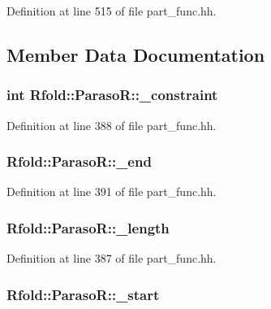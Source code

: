 Definition at line 515 of file part\+\_\+func.\+hh.



\subsection{Member Data Documentation}
\hypertarget{class_rfold_1_1_paraso_r_a869ef980793c7a669a5b89efdc107db5}{
\subsubsection[{\+\_\+constraint}]{\setlength{\rightskip}{0pt plus 5cm}int Rfold\+::\+Paraso\+R\+::\+\_\+constraint}}\label{class_rfold_1_1_paraso_r_a869ef980793c7a669a5b89efdc107db5}


Definition at line 388 of file part\+\_\+func.\+hh.

\hypertarget{class_rfold_1_1_paraso_r_aa0a39f36fc4917382d6e95174150791f}{
\subsubsection[{\+\_\+end}]{ Rfold\+::\+Paraso\+R\+::\+\_\+end}}\label{class_rfold_1_1_paraso_r_aa0a39f36fc4917382d6e95174150791f}


Definition at line 391 of file part\+\_\+func.\+hh.

\hypertarget{class_rfold_1_1_paraso_r_afcca775aebec2ac5d0f659ddb4f625c3}{
\subsubsection[{\+\_\+length}]{ Rfold\+::\+Paraso\+R\+::\+\_\+length}}\label{class_rfold_1_1_paraso_r_afcca775aebec2ac5d0f659ddb4f625c3}


Definition at line 387 of file part\+\_\+func.\+hh.

\hypertarget{class_rfold_1_1_paraso_r_a213a200c99cd89cf6a41715b9d1b4b05}{
\subsubsection[{\+\_\+start}]{ Rfold\+::\+Paraso\+R\+::\+\_\+start}}\label{class_rfold_1_1_paraso_r_a213a200c99cd89cf6a41715b9d1b4b05}


